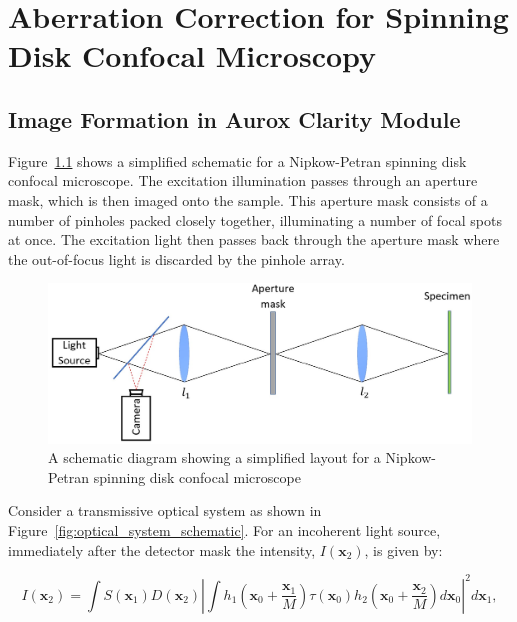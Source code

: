 \chapter{Aberration Correction for Spinning Disk Confocal Microscopy}
\label{chpt:Aurox}

\section{Image Formation in Aurox Clarity Module}
\label{sec:Aurox_image_formation}

Figure~\ref{fig:confocal_schematic} shows a simplified schematic 
for a Nipkow-Petran spinning disk confocal microscope. The 
excitation illumination passes through an aperture mask, which is 
then imaged onto the sample. This aperture mask consists of a 
number of pinholes packed closely together, illuminating a number 
of focal spots at once. The excitation light then passes back 
through the aperture mask where the out-of-focus light is 
discarded by the pinhole array\cite{egger1967new,fuseler2018types}.

\begin{figure}[h]
	\centering
	\includegraphics[width=\textwidth]{images/confocal_schematic.jpg}
	\caption[Simplified Nipkow-Petran confocal layout]{A schematic diagram showing a simplified layout for a Nipkow-Petran spinning disk confocal microscope}
	\label{fig:confocal_schematic}
\end{figure}

Consider a transmissive optical system as shown in 
Figure~\ref{fig:optical_system_schematic}. For an incoherent 
light source, immediately after the detector mask the 
intensity, $I\left(\textbf{x}_{2}\right)$, is given by:

\begin{equation}\label{eq:intensity_after_detector}
I\left(\textbf{x}_{2}\right) = \int S\left(\textbf{x}_{1}\right) D\left(\textbf{x}_{2}\right) \left| \int h_{1}\left(\textbf{x}_{0} + \frac{\textbf{x}_{1}}{M}\right) \tau\left(\textbf{x}_{0}\right) h_{2}\left(\textbf{x}_{0} + \frac{\textbf{x}_{2}}{M}\right)d\textbf{x}_{0}\right|^{2}d\textbf{x}_{1},
\end{equation}

